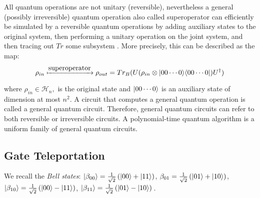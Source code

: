 All quantum operations are not unitary (reversible), nevertheless a general (possibly irreversible) quantum operation also called superoperator can efficiently be simulated by a reversible quantum operations by adding auxiliary states to the original system, then performing a unitary operation on the joint system, and then tracing out $Tr$ some subsystem \cite{KLM07}. More precisely, this can be described as the map:
$$\rho_{in} \xmapsto{\mbox{superoperator}} \rho_{out}=Tr_B(U(\rho_{in} \otimes {\lvert}00\cdots 0\rangle {\langle}00\cdots 0\rvert)U^\dagger)$$

where $\rho_{in} \in \mathcal{H}_n,$ is the original state and ${\lvert}00\cdots 0\rangle$ is an auxiliary state of dimension at most $n^2.$ A circuit that computes a general quantum operation is called a general quantum circuit.  Therefore, general quantum circuits can refer to both reversible or irreversible circuits. A polynomial-time quantum algorithm is a uniform family of general quantum circuits. \\









\subsection{Gate Teleportation}
\label{protocol: gate-teleportation}
We recall the \emph{Bell states}: %
${\lvert}\beta_{00}\rangle=\frac{1}{\sqrt2}\left({\lvert}00\rangle+{\lvert}11\rangle\right)$, ${\beta_{01}}=\frac{1}{\sqrt2}\left({\lvert}01\rangle+{\lvert}10\rangle\right)$,
${\lvert}\beta_{10}\rangle=\frac{1}{\sqrt2}\left({\lvert}00\rangle-{\lvert}11\rangle\right)$,  ${\lvert}\beta_{11}\rangle=\frac{1}{\sqrt2}\left({\lvert}01\rangle-{\lvert}10\rangle\right)$\,.

